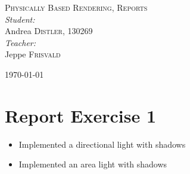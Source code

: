 \documentclass[a4paper]{article}
\begin{document}
\begin{titlepage}
\textsc{\LARGE Physically Based Rendering, Reports}\\[1.5cm]

\emph{Student:}\\
Andrea \textsc{Distler}, 130269\\[1.5cm]

\emph{Teacher:}\\
Jeppe \textsc{Frisvald}\\

\vfill

{\large \today}
\end{titlepage}

\tableofcontents
\newpage


\section{Report Exercise 1}

\begin{itemize}
\item{Implemented a directional light with shadows}
\item{Implemented an area light with shadows}
\end{itemize}
\end{document}
